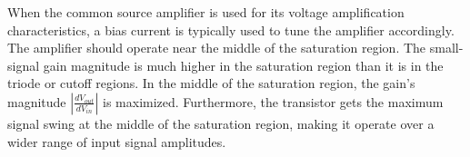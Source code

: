 When the common source amplifier is used for its voltage amplification characteristics, a bias current is typically used to tune the amplifier accordingly. The amplifier should operate near the middle of the saturation region. The small-signal gain magnitude is much higher in the saturation region than it is in the triode or cutoff regions. In the middle of the saturation region, the gain's magnitude $|\frac{dV_{out}}{dV_{in}}|$ is maximized. Furthermore, the transistor gets the maximum signal swing at the middle of the saturation region, making it operate over a wider range of input signal amplitudes. \\
